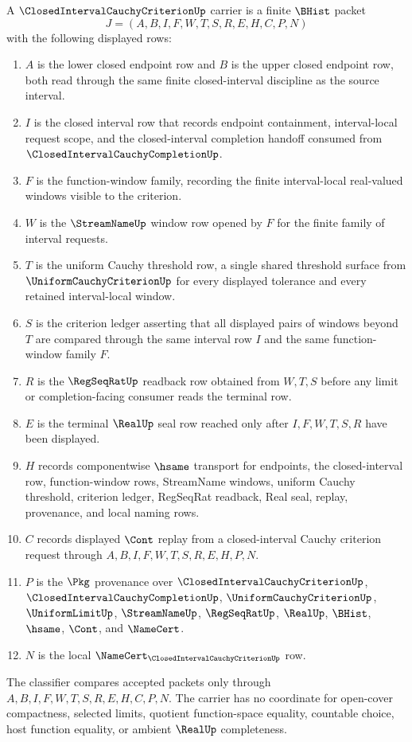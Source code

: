 \begin{definition}
\label{def:closed-interval-cauchy-criterion-carrier}
A $\ClosedIntervalCauchyCriterionUp$ carrier is a finite $\BHist$ packet
$$
J=(A,B,I,F,W,T,S,R,E,H,C,P,N)
$$
with the following displayed rows:
\begin{enumerate}
\item $A$ is the lower closed endpoint row and $B$ is the upper closed endpoint row, both read through the same finite closed-interval discipline as the source interval.
\item $I$ is the closed interval row that records endpoint containment, interval-local request scope, and the closed-interval completion handoff consumed from $\ClosedIntervalCauchyCompletionUp$.
\item $F$ is the function-window family, recording the finite interval-local real-valued windows visible to the criterion.
\item $W$ is the $\StreamNameUp$ window row opened by $F$ for the finite family of interval requests.
\item $T$ is the uniform Cauchy threshold row, a single shared threshold surface from $\UniformCauchyCriterionUp$ for every displayed tolerance and every retained interval-local window.
\item $S$ is the criterion ledger asserting that all displayed pairs of windows beyond $T$ are compared through the same interval row $I$ and the same function-window family $F$.
\item $R$ is the $\RegSeqRatUp$ readback row obtained from $W,T,S$ before any limit or completion-facing consumer reads the terminal row.
\item $E$ is the terminal $\RealUp$ seal row reached only after $I,F,W,T,S,R$ have been displayed.
\item $H$ records componentwise $\hsame$ transport for endpoints, the closed-interval row, function-window rows, StreamName windows, uniform Cauchy threshold, criterion ledger, RegSeqRat readback, Real seal, replay, provenance, and local naming rows.
\item $C$ records displayed $\Cont$ replay from a closed-interval Cauchy criterion request through $A,B,I,F,W,T,S,R,E,H,P,N$.
\item $P$ is the $\Pkg$ provenance over $\ClosedIntervalCauchyCriterionUp$, $\ClosedIntervalCauchyCompletionUp$, $\UniformCauchyCriterionUp$, $\UniformLimitUp$, $\StreamNameUp$, $\RegSeqRatUp$, $\RealUp$, $\BHist$, $\hsame$, $\Cont$, and $\NameCert$.
\item $N$ is the local $\NameCert_{\ClosedIntervalCauchyCriterionUp}$ row.
\end{enumerate}
The classifier compares accepted packets only through $A,B,I,F,W,T,S,R,E,H,C,P,N$. The carrier has no coordinate for open-cover compactness, selected limits, quotient function-space equality, countable choice, host function equality, or ambient $\RealUp$ completeness.
\end{definition}

